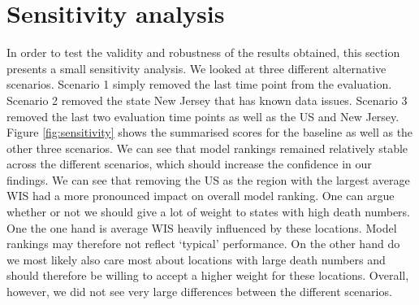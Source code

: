 \documentclass[
]{book}
\begin{document}
\hypertarget{sensitivity}{%
\section{Sensitivity analysis}\label{sensitivity}}

In order to test the validity and robustness of the results obtained, this section presents a small sensitivity analysis. We looked at three different alternative scenarios. Scenario 1 simply removed the last time point from the evaluation. Scenario 2 removed the state New Jersey that has known data issues. Scenario 3 removed the last two evaluation time points as well as the US and New Jersey. Figure \ref{fig:sensitivity} shows the summarised scores for the baseline as well as the other three scenarios. We can see that model rankings remained relatively stable across the different scenarios, which should increase the confidence in our findings. We can see that removing the US as the region with the largest average WIS had a more pronounced impact on overall model ranking. One can argue whether or not we should give a lot of weight to states with high death numbers. One the one hand is average WIS heavily influenced by these locations. Model rankings may therefore not reflect `typical' performance. On the other hand do we most likely also care most about locations with large death numbers and should therefore be willing to accept a higher weight for these locations. Overall, however, we did not see very large differences between the different scenarios.
\end{document}

